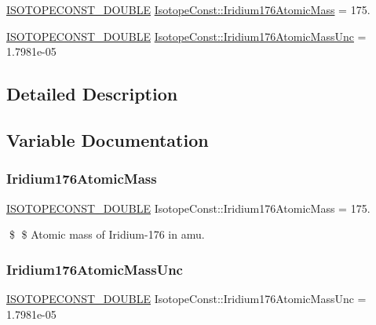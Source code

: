 \begin{DoxyCompactItemize}
\item 
\mbox{\hyperlink{group___isotope_const-_macros_ga8f45a7272ce02c0b4c65c44636ed719a}{I\+S\+O\+T\+O\+P\+E\+C\+O\+N\+S\+T\+\_\+\+D\+O\+U\+B\+LE}} \mbox{\hyperlink{group___isotope_const-_iridium-_ir176_gae9ffe2dd8ca6bfd7ac891371d7704160}{Isotope\+Const\+::\+Iridium176\+Atomic\+Mass}} = 175.
\item 
\mbox{\hyperlink{group___isotope_const-_macros_ga8f45a7272ce02c0b4c65c44636ed719a}{I\+S\+O\+T\+O\+P\+E\+C\+O\+N\+S\+T\+\_\+\+D\+O\+U\+B\+LE}} \mbox{\hyperlink{group___isotope_const-_iridium-_ir176_gad2876907db86e12e38321b11b568ff95}{Isotope\+Const\+::\+Iridium176\+Atomic\+Mass\+Unc}} = 1.\+7981e-\/05
\end{DoxyCompactItemize}


\subsection{Detailed Description}


\subsection{Variable Documentation}
\mbox{\label{group___isotope_const-_iridium-_ir176_gae9ffe2dd8ca6bfd7ac891371d7704160}} 
\subsubsection{\texorpdfstring{Iridium176\+Atomic\+Mass}{Iridium176AtomicMass}}
{\footnotesize\ttfamily \mbox{\hyperlink{group___isotope_const-_macros_ga8f45a7272ce02c0b4c65c44636ed719a}{I\+S\+O\+T\+O\+P\+E\+C\+O\+N\+S\+T\+\_\+\+D\+O\+U\+B\+LE}} Isotope\+Const\+::\+Iridium176\+Atomic\+Mass = 175.}

\$ \$ Atomic mass of Iridium-\/176 in amu. \mbox{\label{group___isotope_const-_iridium-_ir176_gad2876907db86e12e38321b11b568ff95}} 
\subsubsection{\texorpdfstring{Iridium176\+Atomic\+Mass\+Unc}{Iridium176AtomicMassUnc}}
{\footnotesize\ttfamily \mbox{\hyperlink{group___isotope_const-_macros_ga8f45a7272ce02c0b4c65c44636ed719a}{I\+S\+O\+T\+O\+P\+E\+C\+O\+N\+S\+T\+\_\+\+D\+O\+U\+B\+LE}} Isotope\+Const\+::\+Iridium176\+Atomic\+Mass\+Unc = 1.\+7981e-\/05}

